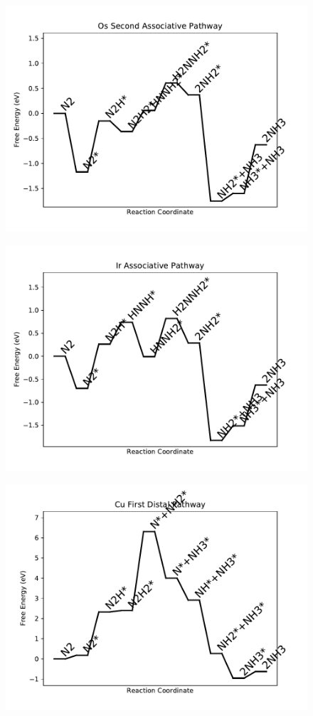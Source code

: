 \begin{figure}
\includegraphics[width=0.8\linewidth]{data/plots/Os_associative_2.pdf}
\label{fig:Os_associative_2}
\end{figure}

\begin{figure}
\includegraphics[width=0.8\linewidth]{data/plots/Ir_associative.pdf}
\label{fig:Ir_associative}
\end{figure}

\begin{figure}
\includegraphics[width=0.8\linewidth]{data/plots/Cu_distal_1.pdf}
\label{fig:Cu_distal_1}
\end{figure}

